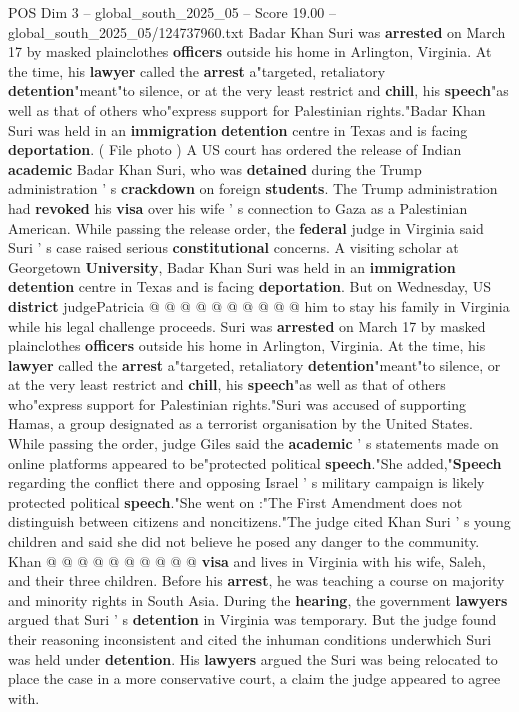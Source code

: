 \begin{textsample}{POS Dim 3 – global\_south\_2025\_05 – Score 19.00 – global\_south\_2025\_05/124737960.txt}  \label{ex:f3_pos_283}
Badar Khan Suri was \textbf{arrested} on March 17 by masked plainclothes \textbf{officers} outside his home in Arlington, Virginia.
At the time, his \textbf{lawyer} called the \textbf{arrest} a"targeted, retaliatory \textbf{detention}"meant"to silence, or at the very least restrict and \textbf{chill}, his \textbf{speech}"as well as that of others who"express support for Palestinian rights."Badar Khan Suri was held in an \textbf{immigration} \textbf{detention} centre in Texas and is facing \textbf{deportation}. ( File photo ) A US court has ordered the release of Indian \textbf{academic} Badar Khan Suri, who was \textbf{detained} during the Trump administration ' s \textbf{crackdown} on foreign \textbf{students}.
The Trump administration had \textbf{revoked} his \textbf{visa} over his wife ' s connection to Gaza as a Palestinian American.
While passing the release order, the \textbf{federal} judge in Virginia said Suri ' s case raised serious \textbf{constitutional} concerns.
A visiting scholar at Georgetown \textbf{University}, Badar Khan Suri was held in an \textbf{immigration} \textbf{detention} centre in Texas and is facing \textbf{deportation}.
But on Wednesday, US \textbf{district} judgePatricia @ @ @ @ @ @ @ @ @ @ him to stay his family in Virginia while his legal challenge proceeds.
Suri was \textbf{arrested} on March 17 by masked plainclothes \textbf{officers} outside his home in Arlington, Virginia.
At the time, his \textbf{lawyer} called the \textbf{arrest} a"targeted, retaliatory \textbf{detention}"meant"to silence, or at the very least restrict and \textbf{chill}, his \textbf{speech}"as well as that of others who"express support for Palestinian rights."Suri was accused of supporting Hamas, a group designated as a terrorist organisation by the United States.
While passing the order, judge Giles said the \textbf{academic} ' s statements made on online platforms appeared to be"protected political \textbf{speech}."She added,"\textbf{Speech} regarding the conflict there and opposing Israel ' s military campaign is likely protected political \textbf{speech}."She went on :"The First Amendment does not distinguish between citizens and noncitizens."The judge cited Khan Suri ' s young children and said she did not believe he posed any danger to the community.
Khan @ @ @ @ @ @ @ @ @ @ \textbf{visa} and lives in Virginia with his wife, Saleh, and their three children.
Before his \textbf{arrest}, he was teaching a course on majority and minority rights in South Asia.
During the \textbf{hearing}, the government \textbf{lawyers} argued that Suri ' s \textbf{detention} in Virginia was temporary.
But the judge found their reasoning inconsistent and cited the inhuman conditions underwhich Suri was held under \textbf{detention}.
His \textbf{lawyers} argued the Suri was being relocated to place the case in a more conservative court, a claim the judge appeared to agree with.

\end{textsample}
